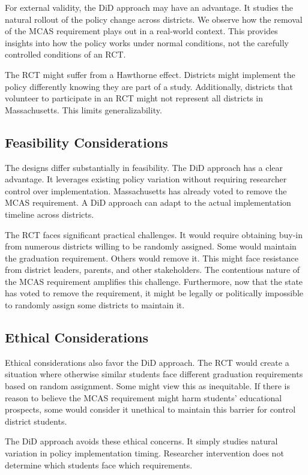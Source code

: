 \documentclass[12pt]{article}
\begin{document}
For external validity, the DiD approach may have an advantage. It studies the natural rollout of the policy change across districts. We observe how the removal of the MCAS requirement plays out in a real-world context. This provides insights into how the policy works under normal conditions, not the carefully controlled conditions of an RCT.

The RCT might suffer from a Hawthorne effect. Districts might implement the policy differently knowing they are part of a study. Additionally, districts that volunteer to participate in an RCT might not represent all districts in Massachusetts. This limits generalizability.

\subsection{Feasibility Considerations}

The designs differ substantially in feasibility. The DiD approach has a clear advantage. It leverages existing policy variation without requiring researcher control over implementation. Massachusetts has already voted to remove the MCAS requirement. A DiD approach can adapt to the actual implementation timeline across districts.

The RCT faces significant practical challenges. It would require obtaining buy-in from numerous districts willing to be randomly assigned. Some would maintain the graduation requirement. Others would remove it. This might face resistance from district leaders, parents, and other stakeholders. The contentious nature of the MCAS requirement amplifies this challenge. Furthermore, now that the state has voted to remove the requirement, it might be legally or politically impossible to randomly assign some districts to maintain it.

\subsection{Ethical Considerations}

Ethical considerations also favor the DiD approach. The RCT would create a situation where otherwise similar students face different graduation requirements based on random assignment. Some might view this as inequitable. If there is reason to believe the MCAS requirement might harm students' educational prospects, some would consider it unethical to maintain this barrier for control district students.

The DiD approach avoids these ethical concerns. It simply studies natural variation in policy implementation timing. Researcher intervention does not determine which students face which requirements.
\end{document}
